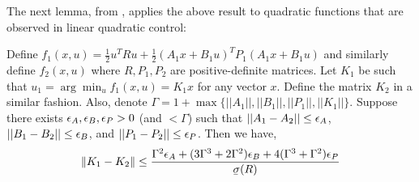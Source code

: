 The next lemma, from \cite{mania19}, applies the above result to quadratic functions that
are observed in linear quadratic control:
\begin{lemma}
  \label{lemma:ce-quadratic}
  Define $f_1(x, u) = \frac{1}{2}u^TRu +
  \frac{1}{2}(A_1x+B_1u)^TP_1(A_1x+B_1u)$ and similarly define $f_2(x,
  u)$ where $R, P_1, P_2$ are positive-definite matrices. Let $K_1$ be
  such that $u_1 = \arg\min_u f_1(x, u) = K_1x$  for
  any vector $x$. Define the matrix $K_2$ in a similar fashion. Also,
  denote $\Gamma = 1 + \max\{||A_1||, \allowbreak||B_1||, ||P_1||,
  ||K_1||\}$. Suppose there exists $\epsilon_A, \epsilon_B, \epsilon_P > 0$ (and
  $<\Gamma$) such that
  $||A_1 - A_2|| \leq \epsilon_A$, $||B_1 - B_2|| \leq
  \epsilon_B$, and $||P_1 - P_2|| \leq \epsilon_P$. Then we have,
  \begin{equation}
    \label{eq:73}
    \|K_{1} - K_{2}\| \leq \frac{\Gamma^2\epsA + (3\Gamma^3 +
      2\Gamma^2)\epsB + 4(\Gamma^3 + \Gamma^2)\epsP}{\ubar{\sigma}(R)}
  \end{equation}
\end{lemma}

